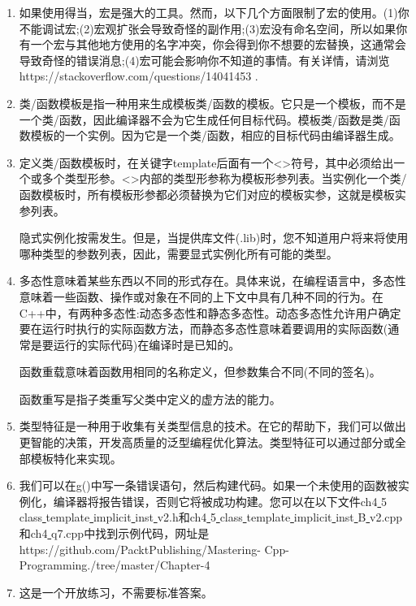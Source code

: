 \begin{enumerate}
	\item 如果使用得当，宏是强大的工具。然而，以下几个方面限制了宏的使用。(1)你不能调试宏;(2)宏观扩张会导致奇怪的副作用;(3)宏没有命名空间，所以如果你有一个宏与其他地方使用的名字冲突，你会得到你不想要的宏替换，这通常会导致奇怪的错误消息;(4)宏可能会影响你不知道的事情。有关详情，请浏览 https:/​/​stackoverflow.​com/​questions/​14041453 .
	\item 类/函数模板是指一种用来生成模板类/函数的模板。它只是一个模板，而不是一个类/函数，因此编译器不会为它生成任何目标代码。模板类/函数是类/函数模板的一个实例。因为它是一个类/函数，相应的目标代码由编译器生成。
	\item 定义类/函数模板时，在关键字template后面有一个<>符号，其中必须给出一个或多个类型形参。<>内部的类型形参称为模板形参列表。当实例化一个类/函数模板时，所有模板形参都必须替换为它们对应的模板实参，这就是模板实参列表。 \par
	隐式实例化按需发生。但是，当提供库文件(.lib)时，您不知道用户将来将使用哪种类型的参数列表，因此，需要显式实例化所有可能的类型。
	\item 多态性意味着某些东西以不同的形式存在。具体来说，在编程语言中，多态性意味着一些函数、操作或对象在不同的上下文中具有几种不同的行为。在C++中，有两种多态性:动态多态性和静态多态性。动态多态性允许用户确定要在运行时执行的实际函数方法，而静态多态性意味着要调用的实际函数(通常是要运行的实际代码)在编译时是已知的。 \par
	函数重载意味着函数用相同的名称定义，但参数集合不同(不同的签名)。 \par
	函数重写是指子类重写父类中定义的虚方法的能力。 \par
	\item 类型特征是一种用于收集有关类型信息的技术。在它的帮助下，我们可以做出更智能的决策，开发高质量的泛型编程优化算法。类型特征可以通过部分或全部模板特化来实现。
	\item 我们可以在g()中写一条错误语句，然后构建代码。如果一个未使用的函数被实例化，编译器将报告错误，否则它将被成功构建。您可以在以下文件ch4\underline{ }5\underline{ }class\underline{ }template\underline{ }implicit\underline{ }inst\underline{ }v2.h和ch4\underline{ }5\underline{ }class\underline{ }template\underline{ }implicit\underline{ }inst\underline{ }B\underline{ }v2.cpp和ch4\underline{ }q7.cpp中找到示例代码，网址是\\https://github.com/PacktPublishing/Mastering- Cpp-Programming./tree/master/Chapter-4
	\item 这是一个开放练习，不需要标准答案。
\end{enumerate}












